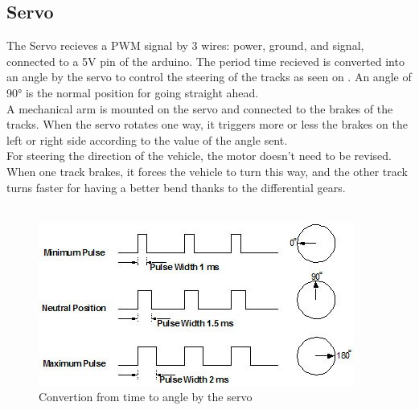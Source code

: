 \subsection{Servo}

The Servo recieves a PWM signal by 3 wires: power, ground, and signal, connected to a 5V pin of the arduino. The period time recieved is converted into an angle by the servo to control the steering of the tracks as seen on . An angle of 90° is the normal position for going straight ahead.\\

A mechanical arm is mounted on the servo and connected to the brakes of the tracks. When the servo rotates one way, it triggers more or less the brakes on the left or right side according to the value of the angle sent.\\

For steering the direction of the vehicle, the motor doesn't need to be revised. When one track brakes, it forces the vehicle to turn this way, and the other track turns faster for having a better bend thanks to the differential gears.\\\\


\begin{figure}[H]
	\centering
	\includegraphics[scale=1]{figures/timeVSangle.jpg}
	\caption{Convertion from time to angle by the servo}
	\label{timeVSangle}
\end{figure}

